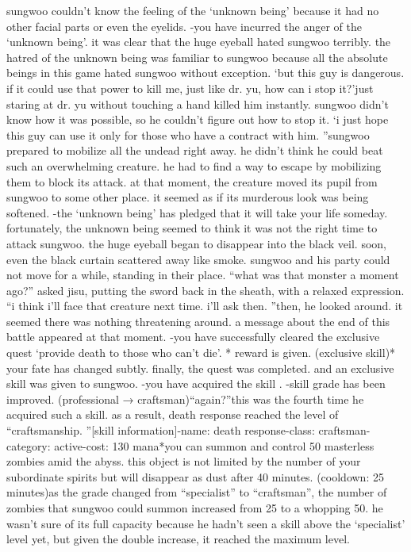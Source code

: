 sungwoo couldn’t know the feeling of the ‘unknown being’ because it had no other facial parts or even the eyelids.
-you have incurred the anger of the ‘unknown being’.
it was clear that the huge eyeball hated sungwoo terribly.
the hatred of the unknown being was familiar to sungwoo because all the absolute beings in this game hated sungwoo without exception.
‘but this guy is dangerous.
 if it could use that power to kill me, just like dr.
 yu, how can i stop it?’just staring at dr.
 yu without touching a hand killed him instantly.
 sungwoo didn’t know how it was possible, so he couldn’t figure out how to stop it.
‘i just hope this guy can use it only for those who have a contract with him.
”sungwoo prepared to mobilize all the undead right away.
 he didn’t think he could beat such an overwhelming creature.
 he had to find a way to escape by mobilizing them to block its attack.
at that moment, the creature moved its pupil from sungwoo to some other place.
 it seemed as if its murderous look was being softened.
-the ‘unknown being’ has pledged that it will take your life someday.
fortunately, the unknown being seemed to think it was not the right time to attack sungwoo.
 the huge eyeball began to disappear into the black veil.
soon, even the black curtain scattered away like smoke.
 sungwoo and his party could not move for a while, standing in their place.
“what was that monster a moment ago?” asked jisu, putting the sword back in the sheath, with a relaxed expression.
“i think i’ll face that creature next time.
 i’ll ask then.
”then, he looked around.
 it seemed there was nothing threatening around.
a message about the end of this battle appeared at that moment.
-you have successfully cleared the exclusive quest ‘provide death to those who can’t die’.
* reward is given.
 (exclusive skill)* your fate has changed subtly.
finally, the quest was completed.
 and an exclusive skill was given to sungwoo.
-you have acquired the skill .
-skill grade has been improved.
 (professional → craftsman)“again?”this was the fourth time he acquired such a skill.
as a result, death response reached the level of “craftsmanship.
”[skill information]-name: death response-class: craftsman-category: active-cost: 130 mana*you can summon and control 50 masterless zombies amid the abyss.
 this object is not limited by the number of your subordinate spirits but will disappear as dust after 40 minutes.
 (cooldown: 25 minutes)as the grade changed from “specialist” to “craftsman”, the number of zombies that sungwoo could summon increased from 25 to a whopping 50.
he wasn’t sure of its full capacity because he hadn’t seen a skill above the ‘specialist’ level yet, but given the double increase, it reached the maximum level.
